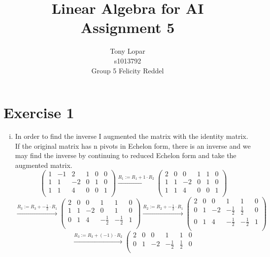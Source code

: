 \documentclass[a4paper]{article}
\title{Linear Algebra for AI\\Assignment 5}
\author{Tony Lopar \\ s1013792 \\ Group 5 \quad Felicity Reddel}
\begin{document}
\maketitle

\section*{Exercise 1}
\begin{enumerate}[i)]
  \item In order to find the inverse I augmented the matrix with the identity matrix. If the original matrix has n pivots in Echelon form, there is an inverse and we may find the inverse by continuing to reduced Echelon form and take the augmented matrix.
  \[
  \left(
  \begin{array}{ccc|ccc}
  1 & -1 & 2 & 1 & 0 & 0 \\
  1 & 1 & -2 & 0 & 1 & 0 \\
  1 & 1 & 4  & 0 & 0 & 1 \\
  \end{array}
  \right)
  \xrightarrow{\text{$R_1 := R_1 + 1 \cdot R_2$}}
  \left(
  \begin{array}{ccc|ccc}
  2 & 0 & 0 & 1 & 1 & 0 \\
  1 & 1 & -2 & 0 & 1 & 0 \\
  1 & 1 & 4  & 0 & 0 & 1 \\
  \end{array}
  \right)
\]
\[
\xrightarrow{\text{$R_3 := R_3 + - \frac{1}{2} \cdot R_1$}}
\left(
\begin{array}{ccc|ccc}
2 & 0 & 0 & 1 & 1 & 0 \\
1 & 1 & -2 & 0 & 1 & 0 \\
0 & 1 & 4  & - \frac{1}{2} & - \frac{1}{2} & 1 \\
\end{array}
\right)
\xrightarrow{\text{$R_2 := R_2 + - \frac{1}{2} \cdot R_1$}}
\left(
\begin{array}{ccc|ccc}
2 & 0 & 0 & 1 & 1 & 0 \\
0 & 1 & -2 & - \frac{1}{2} & \frac{1}{2} & 0 \\
0 & 1 & 4  & - \frac{1}{2} & - \frac{1}{2} & 1 \\
\end{array}
\right)
\]
\[
\xrightarrow{\text{$R_3 := R_3 + (-1) \cdot R_2$}}
\left(
\begin{array}{ccc|ccc}
2 & 0 & 0 & 1 & 1 & 0 \\
0 & 1 & -2 & - \frac{1}{2} & \frac{1}{2} & 0 \\

\end{array}\]
\end{enumerate}
\end{document}
